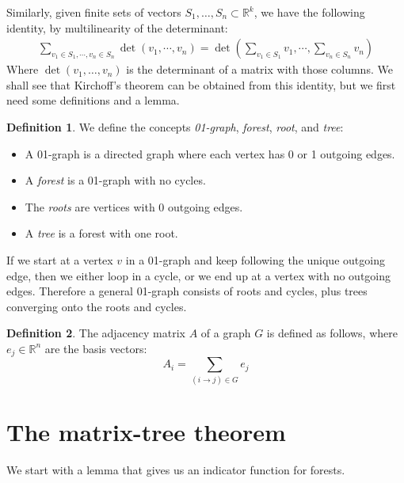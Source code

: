 \documentclass[a4paper, 11pt]{article}
\newcommand{\R}{\mathbb{R}}
\theoremstyle{definition}
\newtheorem{definition}{Definition}[section]
\begin{document}
Similarly, given finite sets of vectors $S_1, \dots, S_n \subset \R^k$, we have the following identity, by multilinearity of the determinant:
\begin{align*}
  \sum_{v_1 \in S_1, \cdots, v_n \in S_n} \det \left(v_1, \cdots, v_n\right) =
  \det\left(\sum_{v_1 \in S_1} v_1, \cdots ,\sum_{v_n \in S_n} v_n\right)
\end{align*}
Where $\det(v_1, \dots, v_n)$ is the determinant of a matrix with those columns. We shall see that Kirchoff's theorem can be obtained from this identity, but we first need some definitions and a lemma.

\begin{definition}
We define the concepts \emph{01-graph}, \emph{forest}, \emph{root}, and \emph{tree}:
 \begin{itemize}
  \item A 01-graph is a directed graph where each vertex has 0 or 1 outgoing edges.
  \item A \emph{forest} is a 01-graph with no cycles.
  \item The \emph{roots} are vertices with 0 outgoing edges.
  \item A \emph{tree} is a forest with one root.
 \end{itemize}
\end{definition}

If we start at a vertex $v$ in a 01-graph and keep following the unique outgoing edge, then we either loop in a cycle, or we end up at a vertex with no outgoing edges. Therefore a general 01-graph consists of roots and cycles, plus trees converging onto the roots and cycles.

\begin{definition}
  The adjacency matrix $A$ of a graph $G$ is defined as follows, where $e_j \in \R^n$ are the basis vectors:
  \[ A_i = \sum_{(i \to j) \in G} e_j  \]
\end{definition}

\section{The matrix-tree theorem}

We start with a lemma that gives us an indicator function for forests.
\end{document}
